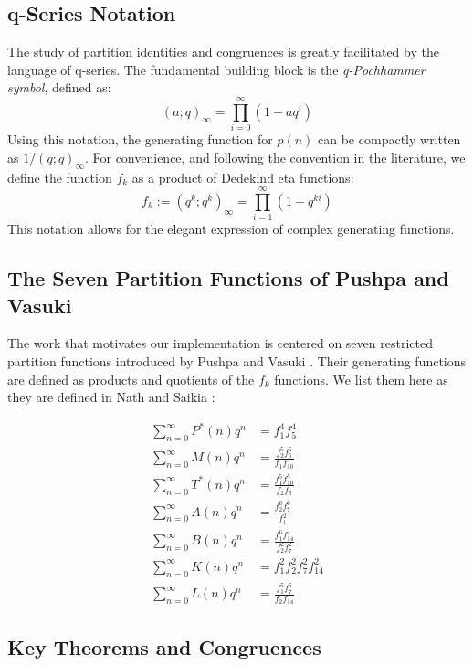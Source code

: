 \documentclass{article}
\begin{document}
\subsection{q-Series Notation}

The study of partition identities and congruences is greatly facilitated by the language of q-series. The fundamental building block is the \textit{q-Pochhammer symbol}, defined as:
\begin{equation}
(a;q)_\infty = \prod_{i=0}^{\infty} (1 - aq^i)
\end{equation}
Using this notation, the generating function for $p(n)$ can be compactly written as $1/(q;q)_\infty$. For convenience, and following the convention in the literature, we define the function $f_k$ as a product of Dedekind eta functions:
\begin{equation}
f_k := (q^k; q^k)_\infty = \prod_{i=1}^{\infty} (1 - q^{ki})
\end{equation}
This notation allows for the elegant expression of complex generating functions.

\subsection{The Seven Partition Functions of Pushpa and Vasuki}

The work that motivates our implementation is centered on seven restricted partition functions introduced by Pushpa and Vasuki \cite{pushpa2022eisenstein}. Their generating functions are defined as products and quotients of the $f_k$ functions. We list them here as they are defined in Nath and Saikia \cite{nath2025arithmetic}:

\begin{align}
\sum_{n=0}^{\infty} P^*(n)q^n &= f_1^4 f_5^4 \\
\sum_{n=0}^{\infty} M(n)q^n &= \frac{f_2^5 f_5^5}{f_1 f_{10}} \\
\sum_{n=0}^{\infty} T^*(n)q^n &= \frac{f_1^5 f_{10}^5}{f_2 f_5} \\
\sum_{n=0}^{\infty} A(n)q^n &= \frac{f_2^6 f_7^6}{f_1^2} \\
\sum_{n=0}^{\infty} B(n)q^n &= \frac{f_1^6 f_{14}^4}{f_2^2 f_7^2} \\
\sum_{n=0}^{\infty} K(n)q^n &= f_1^2 f_2^2 f_7^2 f_{14}^2 \\
\sum_{n=0}^{\infty} L(n)q^n &= \frac{f_1^5 f_7^5}{f_2 f_{14}}
\end{align}

\subsection{Key Theorems and Congruences}
\end{document}
